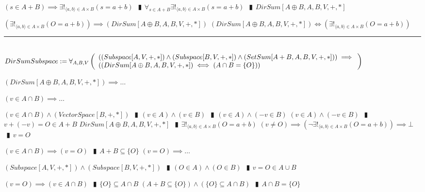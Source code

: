 \documentclass{book}
\newcommand{\abr}{:=}
\newcommand{\pipe}{$\phantom{(}\vrectangleblack\phantom{)}$}
\begin{document}
\begin{shaded}
\begin{enumerate}
\begin{enumerate}
\begin{enumerate}
      \end{enumerate}
      \lit $(s \in A + B) \implies \exists!_{\langle a, b \rangle \in A \times B}(s = a + b)$ \pipe $\forall_{s \in A + B} \exists!_{\langle a, b \rangle \in A \times B}(s = a + b)$ \pipe $DirSum[A \oplus B, A, B, V, +, *]$
    \end{enumerate}
    \lit $(\exists!_{\langle a, b \rangle \in A \times B}(O = a + b)) \implies (DirSum[A \oplus B, A, B, V, +, *])$
    \lit $(DirSum[A \oplus B, A, B, V, +, *]) \iff (\exists!_{\langle a, b \rangle \in A \times B}(O = a + b))$
  \end{enumerate} \vspace{.75mm} \hrule \vspace{.75mm} \ \\ 

  $DirSumSubspace \abr \forall_{A, B, V}\left(\begin{array}{ll}
    ((Subspace[A, V, +, *]) \land (Subspace[B, V, +, *]) \land (SetSum[A + B, A, B, V, +, *])) \hfill \implies \hfill \\
    ((DirSum[A \oplus B, A, B, V, +, *]) \iff (A \cap B = \{O\}))
  \end{array}\right)$
  \begin{enumerate}
    \lit $(DirSum[A \oplus B, A, B, V, +, *]) \implies \ldots$
    \begin{enumerate}
      \lit $(v \in A \cap B) \implies \ldots$
      \begin{enumerate}
        \lit $(v \in A \cap B) \land (VectorSpace[B, +, *])$ \pipe $(v \in A) \land (v \in B)$ \pipe $(v \in A) \land (-v \in B)$
        \lit $(v \in A) \land (-v \in B)$ \pipe $v + (-v) = O \in A + B$
        \lit $DirSum[A \oplus B, A, B, V, +, *]$ \pipe $\exists!_{\langle a, b \rangle \in A \times B}(O = a + b)$
        \lit $(v \neq O) \implies (\lnot \exists!_{\langle a, b \rangle \in A \times B}(O = a + b)) \implies \bot$ \pipe $v = O$
      \end{enumerate}
      \lit $(v \in A \cap B) \implies (v = O)$ \pipe $A + B \subseteq \{O\}$
      \lit $(v = O) \implies \ldots$
      \begin{enumerate}
        \lit $(Subspace[A, V, +, *]) \land (Subspace[B, V, +, *])$ \pipe $(O \in A) \land (O \in B)$ \pipe $v = O \in A \cup B$
      \end{enumerate}
      \lit $(v = O) \implies (v \in A \cap B)$ \pipe $\{O\} \subseteq A \cap B$
      \lit $(A + B \subseteq \{O\}) \land (\{O\} \subseteq A \cap B)$ \pipe $A \cap B = \{O\}$
    \end{enumerate}

\end{enumerate}
\end{shaded}
\end{document}
